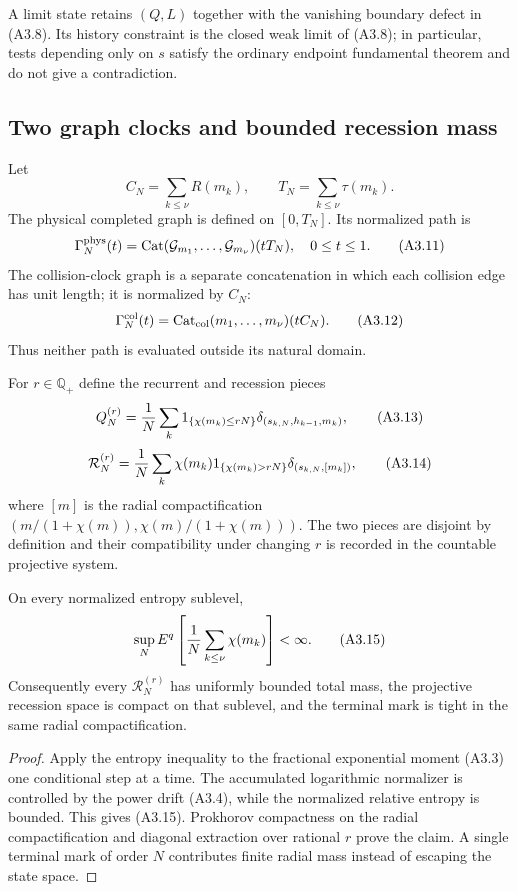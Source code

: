 A limit state retains $(Q,L)$ together with the vanishing boundary defect in
(A3.8).  Its history constraint is the closed weak limit of (A3.8); in
particular, tests depending only on $s$ satisfy the ordinary endpoint
fundamental theorem and do not give a contradiction.

\subsection{Two graph clocks and bounded recession mass}

Let
\[
 C_N=\sum_{k\le\nu}R(m_k),\qquad
 T_N=\sum_{k\le\nu}\tau(m_k).                             \tag{A3.10}
\]
The physical completed graph is defined on $[0,T_N]$.  Its normalized path is
\[
 \Gamma_N^{\rm phys}(t)
 =\operatorname{Cat}(\mathcal G_{m_1},\ldots,\mathcal G_{m_\nu})(tT_N),
 \quad 0\le t\le1.                                       \tag{A3.11}
\]
The collision-clock graph is a separate concatenation in which each collision
edge has unit length; it is normalized by $C_N$:
\[
 \Gamma_N^{\rm col}(t)=\operatorname{Cat}_{\rm col}(m_1,\ldots,m_\nu)(tC_N).
                                                                    \tag{A3.12}
\]
Thus neither path is evaluated outside its natural domain.

For $r\in\mathbb Q_+$ define the recurrent and recession pieces
\[
 Q_N^{(r)}={1\over N}\sum_k1_{\{\chi(m_k)\le rN\}}
   \delta_{(s_{k,N},h_{k-1},m_k)},                        \tag{A3.13}
\]
\[
 \mathcal R_N^{(r)}={1\over N}\sum_k\chi(m_k)
  1_{\{\chi(m_k)>rN\}}\delta_{(s_{k,N},[m_k])},           \tag{A3.14}
\]
where $[m]$ is the radial compactification
$(m/(1+\chi(m)),\chi(m)/(1+\chi(m)))$.  The two pieces are disjoint by
definition and their compatibility under changing $r$ is recorded in the
countable projective system.

\begin{lemma}
\label{lem:r29-a3-compact}
On every normalized entropy sublevel,
\[
 \sup_N E^q\left[{1\over N}\sum_{k\le\nu}\chi(m_k)\right]<\infty.        \tag{A3.15}
\]
Consequently every $\mathcal R_N^{(r)}$ has uniformly bounded total mass,
the projective recession space is compact on that sublevel, and the terminal
mark is tight in the same radial compactification.
\end{lemma}

\begin{proof}
Apply the entropy inequality to the fractional exponential moment (A3.3) one
conditional step at a time.  The accumulated logarithmic normalizer is
controlled by the power drift (A3.4), while the normalized relative entropy is
bounded.  This gives (A3.15).  Prokhorov compactness on the radial compactification
and diagonal extraction over rational $r$ prove the claim.  A single terminal
mark of order $N$ contributes finite radial mass instead of escaping the
state space.
\end{proof}

